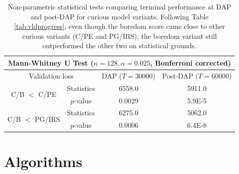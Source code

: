 \documentclass[utf8]{frontiersSCNS}
\begin{document}
\begin{table}[bh!]
	\begin{center}
	\caption{Non-parametric statistical tests comparing terminal performance at DAP and post-DAP for curious model variants. Following Table \ref{tab:vldprogress}, even though the boredom score came close to other curious variants (C/PE and PG/IRS), the boredom variant still outperformed the other two on statistical grounds.}
	\label{tab:stats}
	\begin{tabular}{c c c c}
	\multicolumn{4}{c}{Mann-Whitney U Test ($n=128, \alpha=0.025$, Bonferroni corrected)} \\
	\toprule
	\multicolumn{2}{c}{Validation loss}
	& DAP ($T=30000$) & Post-DAP ($T=60000$) \\
	\midrule
	\multirow{2}{*}{C/B $<$ C/PE} 
		& Statistics    & 6558.0 & 5911.0 \\
		& {\it p}-value & 0.0029 & 5.9E-5 \\ 
	\multirow{2}{*}{C/B $<$ PG/IRS} 
		& Statistics    & 6275.0 & 5062.0 \\
		& {\it p}-value & 0.0006 & 6.4E-8 \\
	\bottomrule
	\end{tabular}
	\end{center}
\end{table}


\section*{Algorithms}
\end{document}
